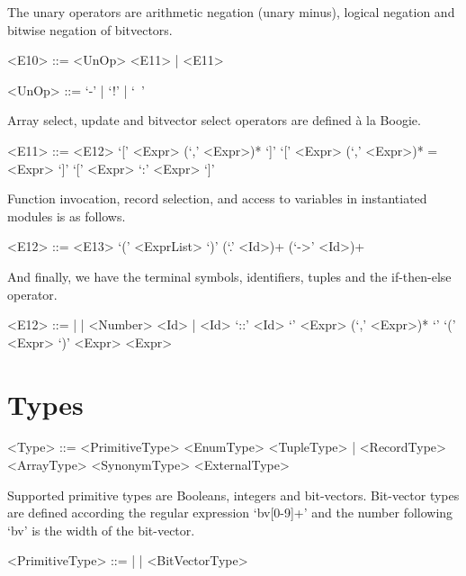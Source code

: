 The unary operators are arithmetic negation (unary minus), logical negation and bitwise negation of bitvectors.
\begin{grammar}
    <E10> ::= <UnOp> <E11> | <E11>

    <UnOp> ::= `-' | `!' | `~'
\end{grammar}

Array select, update and bitvector select operators are defined \`a la Boogie.
\begin{grammar}
    <E11> ::= <E12> `[' <Expr> (`,' <Expr>)* `]'
           `[' <Expr> (`,' <Expr>)* = <Expr> `]'
           `[' <Expr> `:' <Expr> `]'
\end{grammar}

Function invocation, record selection, and access to variables in instantiated modules is as follows.
\begin{grammar}
    <E12> ::=  <E13> `(' <ExprList> `)'
           (`.' <Id>)+
           (`->' <Id>)+
\end{grammar}

And finally, we have the terminal symbols, identifiers, tuples and the if-then-else operator.
\begin{grammar}
    <E12> ::=  |  | <Number>
          \alt <Id> | <Id> `::' <Id>
          \alt `{' <Expr> (`,' <Expr>)* `}'
          \alt {} `(' <Expr> `)'  <Expr>  <Expr>
\end{grammar}

\section{Types}

\begin{grammar}
<Type> ::= <PrimitiveType> 
       \alt <EnumType> 
       \alt <TupleType> | <RecordType> 
       \alt <ArrayType> 
       \alt <SynonymType> 
       \alt <ExternalType> 
\end{grammar}

Supported primitive types are Booleans, integers and bit-vectors. Bit-vector types are defined according the regular expression `bv[0-9]+' and the number following `bv' is the width of the bit-vector.

\begin{grammar}
    <PrimitiveType> ::=  |  | <BitVectorType>
\end{grammar}

